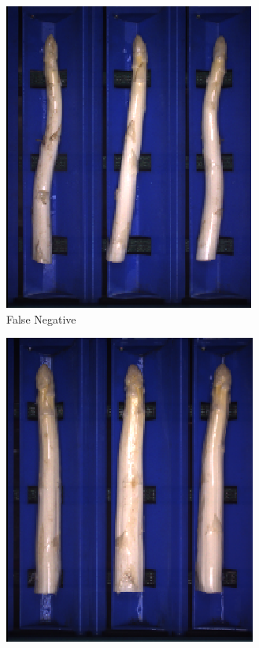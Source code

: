 \begin{figure}[h]
	\centering
	\begin{subfigure}{0.3\textwidth}
		\includegraphics[width=0.9\linewidth]{Figures/appendix/rustyhead_falsenegative_01.png}
		\vspace{-5pt}
		\caption{False Negative}
	\end{subfigure}
	\begin{subfigure}{0.3\textwidth}
		\includegraphics[width=0.9\linewidth]{Figures/appendix/rustyhead_falsenegative_02.png}

\end{subfigure}
\end{figure}
